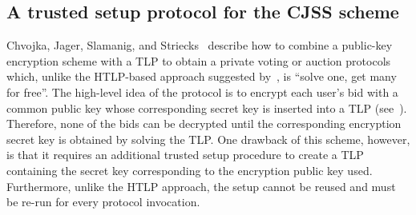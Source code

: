 
\subsection{A trusted setup protocol for the CJSS scheme}\label{sec:seq_mpc_tlp}

Chvojka, Jager, Slamanig, and Striecks~\cite{ESORICS:CJSS21} describe how to combine a public-key encryption scheme with a TLP to obtain a private voting or auction protocols which, unlike the HTLP-based approach suggested by~\cite{C:MalThy19}, is ``solve one, get many for free''. The high-level idea of the protocol is to encrypt each user's bid with a common public key whose corresponding secret key is inserted into a TLP (see~). Therefore, none of the bids can be decrypted until the corresponding encryption secret key is obtained by solving the TLP. One drawback of this scheme, however, is that it requires an additional trusted setup procedure to create a TLP containing the secret key corresponding to the encryption public key used. Furthermore, unlike the HTLP approach, the setup cannot be reused and must be re-run for every protocol invocation.

